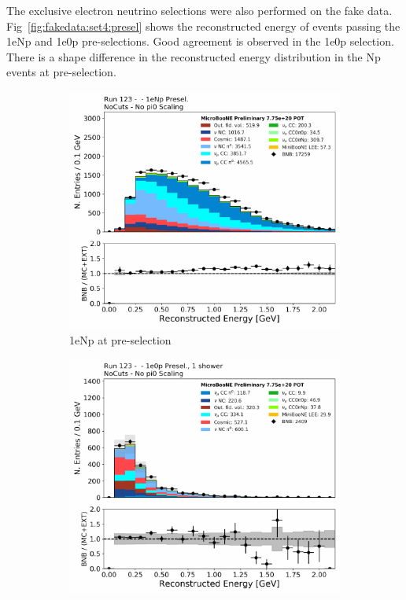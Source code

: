 The exclusive electron neutrino selections were also performed on the fake data. Fig~\ref{fig:fakedata:set4:presel} shows the reconstructed energy of events passing the 1eNp and 1e0p pre-selections.  Good agreement is observed in the 1e0p selection.  There is a shape difference in the reconstructed energy distribution in the Np events at pre-selection.

\begin{figure}[H] 
\begin{center}
    \begin{subfigure}[b]{0.45\textwidth}
    \centering
    \includegraphics[width=1.00\textwidth]{Fakedata/set4/Np_presel_recoe.pdf}
    \caption{\label{fig:fakedata:set4:Np_presel_recoe} 1eNp at pre-selection}
    \end{subfigure}
    \begin{subfigure}[b]{0.45\textwidth}
    \centering
    \includegraphics[width=1.00\textwidth]{Fakedata/set4/zp_presel_recoe.pdf}

\end{subfigure}
\end{center}
\end{figure}
